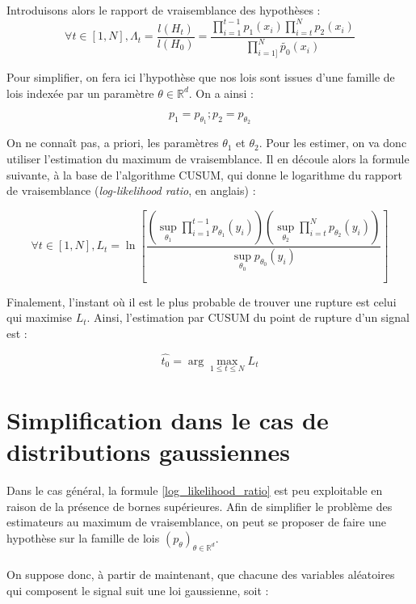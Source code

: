 \documentclass[french,12pt,notitlepage]{report}
\begin{document}
	Introduisons alors le rapport de vraisemblance des hypothèses :
	\begin{equation}
		\forall t \in [1, N], \Lambda_t = \frac{l(H_t)}{l(H_0)} = \frac{\prod_{i = 1}^{t-1} p_1(x_i) \prod_{i = t}^{N} p_2(x_i)}{\prod_{i = 1]}^{N} \tilde{p_0}(x_i)}
	\end{equation}
	
	Pour simplifier, on fera ici l'hypothèse que nos lois sont issues d'une famille de lois indexée par un paramètre $\theta \in \mathbb{R}^d$. On a ainsi :
	
	\begin{equation*}
		p_1 = p_{\theta_1} ; p_2 = p_{\theta_2}
	\end{equation*}
	
	On ne connaît pas, a priori, les paramètres $\theta_1$ et $\theta_2$. Pour les estimer, on va donc utiliser l'estimation du maximum de vraisemblance. Il en découle alors la formule suivante, à la base de l'algorithme CUSUM, qui donne le logarithme du rapport de vraisemblance (\textit{log-likelihood ratio}, en anglais) :
	
	\begin{equation}
		\forall t \in [1, N], L_t=\ln\left[\frac{\left(\sup_{\theta_1}\prod_{i=1}^{t-1}p_{\theta_1}(y_i)\right)\left(\sup_{\theta_2}\prod_{i=t}^Np_{\theta_2}(y_i)\right)}{\sup_{\theta_0}p_{\theta_0}(y_i)}\right]
		\label{log_likelihood_ratio}
	\end{equation}
	
	Finalement, l'instant où il est le plus probable de trouver une rupture est celui qui maximise $L_t$. Ainsi, l'estimation par CUSUM du point de rupture d'un signal est :
	
	\begin{equation}
		\hat{t_0}=\arg\max_{1\le t\le N}L_t
	\end{equation}
	
	\section{Simplification dans le cas de distributions gaussiennes}
	Dans le cas général, la formule \ref{log_likelihood_ratio} est peu exploitable en raison de la présence de bornes supérieures. Afin de simplifier le problème des estimateurs au maximum de vraisemblance, on peut se proposer de faire une hypothèse sur la famille de lois $(p_\theta)_{\theta \in \mathbb{R}^d}$.
	\\ \\
	On suppose donc, à partir de maintenant, que chacune des variables aléatoires qui composent le signal suit une loi gaussienne, soit :
	
\end{document}
